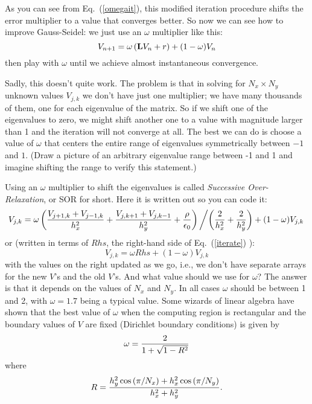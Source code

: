 As you can see from Eq.~(\ref{omegait}), this modified iteration
procedure shifts the error multiplier to a value that converges
better. So now we can see how to improve Gauss-Seidel: we just use
an $\omega$ multiplier like this:
\begin{equation}
    V_{n+1} = \omega \left( {\bf L}  V_n + r \right) + (1-\omega) V_n
\end{equation}
then play with $\omega$ until we achieve almost instantaneous
convergence.

Sadly, this doesn't quite work. The problem is that in solving
for $N_x \times N_y$ unknown values $V_{j,k}$ we don't have
just one multiplier; we have many thousands of them, one for
each eigenvalue of the matrix. So if we shift one of the
eigenvalues to zero, we might shift another one to a value with
magnitude larger than 1 and the iteration will not converge at
all. The best we can do is choose a value of $\omega$ that
centers the entire range of eigenvalues symmetrically between
$-1$ and $1$. (Draw a picture of an arbitrary eigenvalue range
between -1 and 1 and imagine shifting the range to verify this
statement.)


Using an $\omega$ multiplier to shift the eigenvalues is called {\it
Successive Over-Relaxation}, or SOR for short. Here it is written
out so you can code it:
\begin{equation}
    V_{j,k}= \omega \left(
    {V_{j+1,k}+V_{j-1,k} \over h_x^2} +
    {V_{j,k+1}+V_{j,k-1} \over h_y^2} +
    {\rho \over \epsilon_0} \right) \left/ \left(
    {2 \over h_x^2} + {2 \over h_y^2} \right)
    + (1-\omega) V_{j,k} \right.
    \label{SOReq}
\end{equation}
or (written in terms of $Rhs$, the right-hand side of
Eq.~(\ref{iterate}) ):
\begin{equation}
    V_{j,k}= \omega Rhs
    + (1-\omega) V_{j,k}
    \label{SOReqrhs}
\end{equation}
with the values on the right updated as we go, i.e., we don't
have separate arrays for the new $V$'s and the old $V$'s. And
what value should we use for $\omega$? The answer is that it
depends on the values of $N_x$ and $N_y$. In all cases $\omega$
should be between 1 and 2, with $\omega=1.7$ being a typical
value. Some wizards of linear algebra have shown that the best
value of $\omega$ when the computing region is rectangular
and the boundary values of $V$ are fixed (Dirichlet boundary
conditions) is given by
\begin{equation}
    \omega = {2 \over 1 + \sqrt{1-R^2}}
    \label{optimum}
\end{equation}
where
\begin{equation}
    R = { h_y^2 \cos{( \pi/N_x )} + h_x^2 \cos{( \pi / N_y)} \over
    h_x^2 + h_y^2} .
\end{equation}

